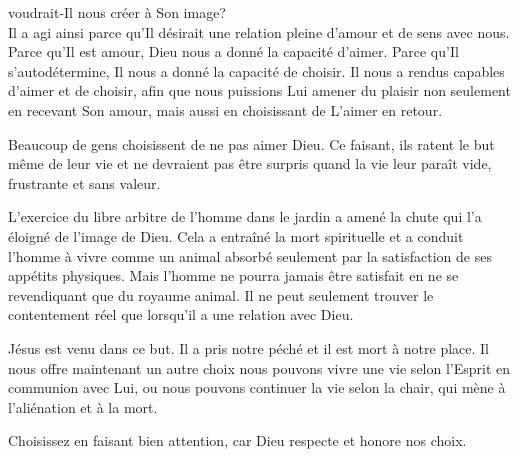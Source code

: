 




 voudrait-Il nous créer à Son image? \\[1ex]
Il a agi ainsi parce qu'Il désirait une relation pleine d'amour et de sens avec
 nous. Parce qu'Il est amour, Dieu nous a donné la capacité d'aimer. Parce qu'Il
 s'autodétermine, Il nous a donné la capacité de choisir. Il nous a rendus
 capables d'aimer et de choisir, afin que nous puissions Lui amener du plaisir
 \ocadr{}non seulement en recevant Son amour, mais aussi en choisissant de L'aimer
 en retour. 

Beaucoup de gens choisissent de ne pas aimer Dieu. Ce faisant, ils ratent le but
 même de leur vie et ne devraient pas être surpris quand la vie leur paraît vide,
 frustrante et sans valeur.


L'exercice du libre arbitre de l'homme dans le jardin a amené la chute qui l'a
 éloigné de l'image de Dieu. Cela a entraîné la mort spirituelle et a conduit
 l'homme à vivre comme un animal \ocadr{}absorbé seulement par la satisfaction de ses
 appétits physiques. Mais l'homme ne pourra jamais être satisfait en ne se
 revendiquant que du royaume animal. Il ne peut seulement trouver le contentement
 réel que lorsqu'il a une relation avec Dieu. 

Jésus est venu dans ce but. Il a pris notre péché et il est mort à notre place.
 Il nous offre maintenant un autre choix \ocadr{}nous pouvons vivre une vie selon
 l'Esprit en communion avec Lui, ou nous pouvons continuer la vie selon la chair,
 qui mène à l'aliénation et à la mort. 

Choisissez en faisant bien attention, car Dieu respecte et honore nos choix. 

\dvrule




